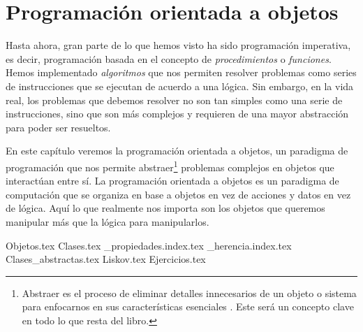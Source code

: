 \chapter{Programación orientada a objetos}
  \begin{refsection}
    Hasta ahora, gran parte de lo que hemos visto ha sido programación imperativa, es decir,
    programación basada en el concepto de \textit{procedimientos} o \textit{funciones}.
    Hemos implementado \textit{algoritmos} que nos permiten resolver problemas como series de
    instrucciones que se ejecutan de acuerdo a una lógica.
    Sin embargo, en la vida real, los problemas que debemos resolver no son tan simples como
    una serie de instrucciones, sino que son más complejos y requieren de una mayor abstracción
    para poder ser resueltos.

    En este capítulo veremos la programación orientada a objetos, un paradigma de programación
    que nos permite abstraer\footnote{
      Abstraer es el proceso de eliminar detalles innecesarios de un objeto o sistema para 
      enfocarnos en sus características esenciales \cite{ObjectorientedProgramming2023}.
      Este será un concepto clave en todo lo que resta del libro.
    } problemas complejos en objetos que interactúan entre sí.
    La programación orientada a objetos es un paradigma de computación que se organiza en base a 
    objetos en vez de acciones y datos en vez de lógica.
    Aquí lo que realmente nos importa son los objetos que queremos manipular más que la lógica para
    manipularlos.

    {Objetos.tex}
    {Clases.tex}
    {_propiedades.index.tex}
    {_herencia.index.tex}
    {Clases_abstractas.tex}
    {Liskov.tex}
    {Ejercicios.tex}
    \nocite{*}
    \printbibliography[keyword=oop]
  \end{refsection}